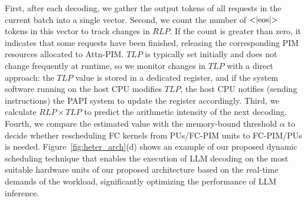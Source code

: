 First, after each decoding, we gather the output tokens of all requests in the current batch into a single vector.
Second, we count the number of $\text{\textless|eos|\textgreater}$ tokens in this vector to track changes in $RLP$. If the count is greater than zero, it indicates that some requests have been finished, releasing the corresponding PIM resources allocated to Attn-PIM. $TLP$ is typically set initially and does not change frequently at runtime, so we monitor changes in $TLP$ with a direct approach: the $TLP$ value is stored in a dedicated register, and if the system software running on the host CPU modifies $TLP$, the host CPU notifies (sending instructions) the PAPI system to update the register accordingly.
Third, we calculate $RLP \times TLP$ to predict the arithmetic intensity of the next decoding.
Fourth, we compare the estimated value with the memory-bound threshold $\alpha$ to decide whether rescheduling FC kernels from PUs/FC-PIM units to FC-PIM/PUs is needed.
Figure~\ref{fig:heter_arch}(d) shows an example of our proposed dynamic scheduling technique that enables the execution of LLM decoding on the most suitable hardware units of our proposed architecture based on the real-time demands of the workload, significantly optimizing the performance of LLM inference.

